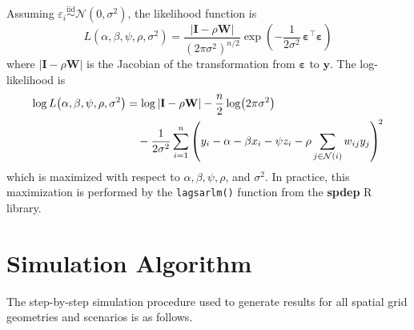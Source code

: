\documentclass{article}[11pt]
\begin{document}
Assuming $\varepsilon_i \overset{\text{iid}}{\sim} \mathcal{N}(0,\sigma^2)$, the likelihood function is
\begin{equation*}
    L\!\left(\alpha,\beta,\psi,\rho,\sigma^2\right)
    = \frac{|\mathbf{I} - \rho\mathbf{W}|}{\left(2\pi\sigma^2\right)^{n/2}}
      \exp\!\left(-\frac{1}{2\sigma^2}\,\boldsymbol{\varepsilon}^{\top}\boldsymbol{\varepsilon}\right)
\end{equation*}
where $|\mathbf{I}-\rho\mathbf{W}|$ is the Jacobian of the transformation from $\boldsymbol{\varepsilon}$ to $\mathbf{y}$. The log-likelihood is
\begin{align*}
    \log L\!\left(\alpha,\beta,\psi,\rho,\sigma^2\right)
    &= \log|\mathbf{I} - \rho\mathbf{W}|
       - \frac{n}{2}\log\!\left(2\pi\sigma^2\right) \notag \\
    &\quad - \frac{1}{2\sigma^2}
        \sum_{i=1}^{n}
        \left(y_i - \alpha - \beta x_i - \psi z_i - \rho\sum_{j \in \mathcal{N}(i)}w_{ij}y_j\right)^{\!2}
\end{align*}
which is maximized with respect to $\alpha, \beta, \psi, \rho$, and $\sigma^2$. In practice, this maximization is performed by the \texttt{lagsarlm()} function from the \textbf{spdep} R library\cite{bivand_r_2022}.

\section{Simulation Algorithm}\label{appendix:SimAlgorithm}

The step-by-step simulation procedure used to generate results for all spatial grid geometries and scenarios is as follows.
\end{document}

